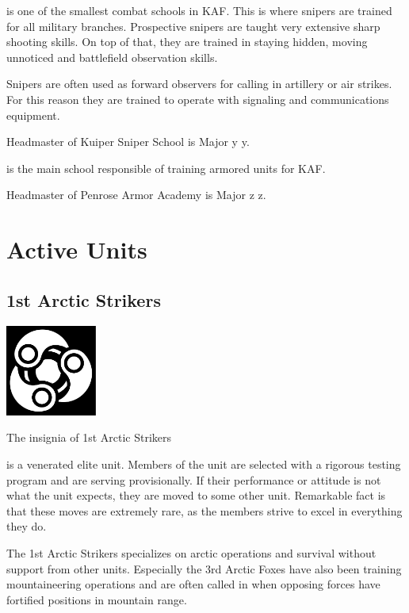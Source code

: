 \documentclass{tufte-book}
\begin{document}
 is one of the smallest combat schools in KAF.
This is where snipers are trained for all military branches. Prospective
snipers are taught very extensive sharp shooting skills. On top of that, they
are trained in staying hidden, moving unnoticed and battlefield observation
skills.

Snipers are often used as forward observers for calling in artillery or air
strikes. For this reason they are trained to operate with signaling and
communications equipment.

Headmaster of Kuiper Sniper School is Major y y.

 is the main school responsible of training
armored units for KAF.

Headmaster of Penrose Armor Academy is Major z z.

\section{Active Units}
\label{sc:active_units}

\subsection{1st Arctic Strikers}
\label{sc:arctic_strikers}

\begin{marginfigure}[0\baselineskip]
  \includegraphics[width=3cm]{triple-yin}
  \caption{The insignia of 1st Arctic Strikers}
  \label{fig:arctic_strikers}
\end{marginfigure}

 is a venerated elite unit. Members of the unit
are selected with a rigorous testing program and are serving provisionally.
If their performance or attitude is not what the unit expects, they are moved
to some other unit. Remarkable fact is that these moves are extremely rare,
as the members strive to excel in everything they do.

The 1st Arctic Strikers specializes on arctic operations and survival without
support from other units. Especially the 3rd Arctic Foxes have also been
training mountaineering operations and are often called in when opposing
forces have fortified positions in mountain range.
\end{document}
